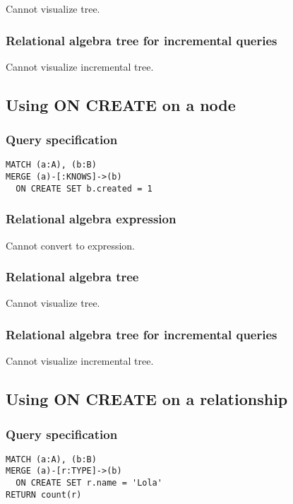 Cannot visualize tree.

\subsubsection*{Relational algebra tree for incremental queries}

Cannot visualize incremental tree.

\subsection{Using ON CREATE on a node}

\subsubsection*{Query specification}

\begin{lstlisting}
MATCH (a:A), (b:B)
MERGE (a)-[:KNOWS]->(b)
  ON CREATE SET b.created = 1
\end{lstlisting}

\subsubsection*{Relational algebra expression}

Cannot convert to expression.

\subsubsection*{Relational algebra tree}

Cannot visualize tree.

\subsubsection*{Relational algebra tree for incremental queries}

Cannot visualize incremental tree.

\subsection{Using ON CREATE on a relationship}

\subsubsection*{Query specification}

\begin{lstlisting}
MATCH (a:A), (b:B)
MERGE (a)-[r:TYPE]->(b)
  ON CREATE SET r.name = 'Lola'
RETURN count(r)
\end{lstlisting}

